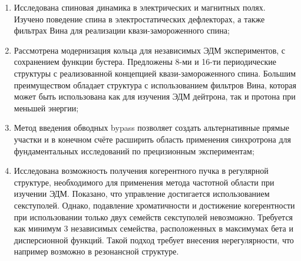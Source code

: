 \begin{enumerate}

\item Исследована спиновая динамика в электрических и магнитных полях. Изучено поведение спина в электростатических дефлекторах, а также фильтрах Вина для реализации квази-замороженного спина;

\item Рассмотрена модернизация кольца для независимых ЭДМ экспериментов, с сохранением функции бустера. Предложены 8-ми и 16-ти периодические структуры с реализованной концепцией квази-замороженного спина. Большим преимуществом обладает структура с использованием фильтров Вина, которая может быть использована как для изучения ЭДМ дейтрона, так и протона при меньшей энергии;

\item Метод введения обводных bypass позволяет создать альтернативные прямые участки и в конечном счёте расширить область применения синхротрона для фундаментальных исследований по прецизионным экспериментам; 

\item Исследована возможность получения когерентного пучка в регулярной структуре, необходимого для применения метода частотной области при изучении ЭДМ. Показано, что управление достигается использованием секступолей. Однако, подавление хроматичности и достижение когерентности при использовании только двух семейств секступолей невозможно. Требуется как минимум 3 независимых семейства, расположенных в максимумах бета и дисперсионной функций. Такой подход требует внесения нерегулярности, что например возможно в резонансной структуре.

\end{enumerate}

\FloatBarrier
